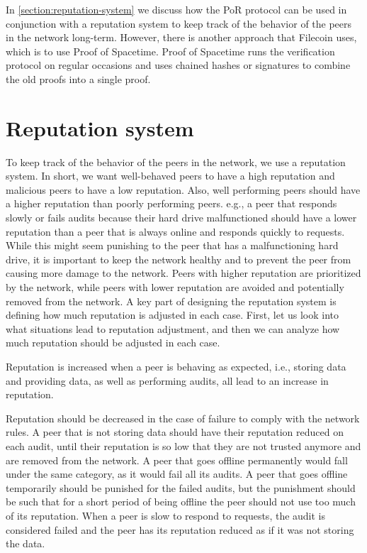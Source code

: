 In \autoref{section:reputation-system} we discuss how the PoR protocol can be used in conjunction with
a reputation system to keep track of the behavior of the peers in the network long-term.
However, there is another approach that Filecoin \cite{filecoin} uses, which is to use 
Proof of Spacetime.
Proof of Spacetime runs the verification protocol on regular occasions and uses chained hashes or signatures
to combine the old proofs into a single proof.

\section{Reputation system}
\label{section:reputation-system}

To keep track of the behavior of the peers in the network, we use a reputation system.
In short, we want well-behaved peers to have a high reputation and malicious peers to have a low reputation.
Also, well performing peers should have a higher reputation than poorly performing peers.
e.g., a peer that responds slowly or fails audits because their hard drive malfunctioned should
have a lower reputation than a peer that is always online and responds quickly to requests.
While this might seem punishing to the peer that has a malfunctioning hard drive,
it is important to keep the network healthy and to prevent the peer from causing more damage to the network.
Peers with higher reputation are prioritized by the network, while peers with lower reputation are
avoided and potentially removed from the network.
A key part of designing the reputation system is defining how much reputation is adjusted in each case.
First, let us look into what situations lead to reputation adjustment, and then we can
analyze how much reputation should be adjusted in each case.

Reputation is increased when a peer is behaving as expected,
i.e., storing data and providing data, as well as performing audits, all lead to an increase in reputation.

Reputation should be decreased in the case of failure to comply with the network rules.
A peer that is not storing data should have their reputation reduced on each audit,
until their reputation is so low that they are not trusted anymore and are removed from the network.
A peer that goes offline permanently would fall under the same category, as it would fail all its audits.
A peer that goes offline temporarily should be punished for the failed audits,
but the punishment should be such that for a short period of being offline the peer should not use 
too much of its reputation.
When a peer is slow to respond to requests, the audit is considered failed and the peer has
its reputation reduced as if it was not storing the data.

